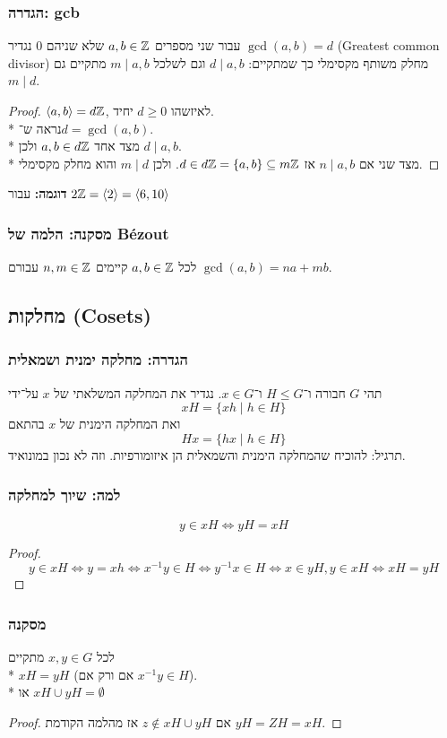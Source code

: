 \subsubsection{הגדרה: gcb}
עבור שני מספרים $a, b \in \mathbb{Z}$ שלא שניהם $0$ נגדיר $\gcd(a, b) = d$ (Greatest common divisor) מחלק משותף מקסימלי כך שמתקיים:
$d \mid a, b$ וגם לשלכל $m \mid a, b$ מתקיים גם $m \mid d$.
\begin{proof}
	$\langle a, b \rangle = d\mathbb{Z}$, לאיזשהו $d \ge 0$ יחיד. \\*
	נראה ש־$d = \gcd(a, b)$. \\*
	מצד אחד $a, b \in d \mathbb{Z}$ ולכן $d \mid a, b$. \\*
	מצד שני אם $n \mid a, b$ אז $d \in d \mathbb{Z} = \{a, b \} \subseteq m \mathbb{Z}$. ולכן $m \mid d$ והוא מחלק מקסימלי.
\end{proof}
 \textbf{דוגמה: }
 עבור $2 \mathbb{Z} = \langle 2 \rangle = \langle 6, 10 \rangle$

 \subsubsection{מסקנה: הלמה של Bézout}
 לכל $a, b \in \mathbb{Z}$ קיימים $n, m \in \mathbb{Z}$ עבורם $\gcd(a, b) = na + mb$.

\subsection{מחלקות (Cosets)}
\subsubsection{הגדרה: מחלקה ימנית ושמאלית}
תהי $G$ חבורה ו־$H \le G$ ו־$x \in G$. 
נגדיר את המחלקה המשלאתי של $x$ על־ידי
\[
	x H = \{x h \mid h \in H\}
\]
ואת המחלקה הימנית של $x$ בהתאם
\[
	H x = \{h x \mid h \in H\}
\]
תרגיל: להוכיח שהמחלקה הימנית והשמאלית הן איזומורפיות. וזה לא נכון במונואיד.

\subsubsection{למה: שיוך למחלקה}
\[
	y \in xH \iff yH = xH
\]
\begin{proof}
	\[
		y \in xH
		\iff  y = x h
		\iff x^{-1} y \in H
		\iff y^{-1} x \in H
		\iff x \in yH, y \in xH
		\iff xH = yH
	\]
\end{proof}
\subsubsection{מסקנה}
לכל $x, y \in G$ מתקיים \\*
$x H = y H$ (אם ורק אם $x^{-1} y \in H$). \\*
או $xH \cup yH = \emptyset$
\begin{proof}
	אם $z \not\in xH \cup yH$ אז מהלמה הקודמת $yH = ZH = xH$.
\end{proof}

